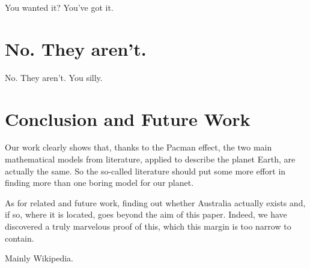 \documentclass{article}
\begin{document}

You wanted it? You've got it.


\section{No. They aren't.}
No. They aren't. You silly.

\section{Conclusion and Future Work}
Our work clearly shows that, thanks to the Pacman effect, the two main mathematical models from literature, applied to describe the planet Earth, are actually the same. So the so-called literature should put some more effort in finding more than one boring model for our planet.

As for related and future work, finding out whether Australia actually exists and, if so, where it is located, goes beyond the aim of this paper. Indeed, we have discovered a truly marvelous proof of this, which this margin is too narrow to contain.

\begin{thebibliography}{1}

  Mainly Wikipedia.

\end{thebibliography}
\end{document}
